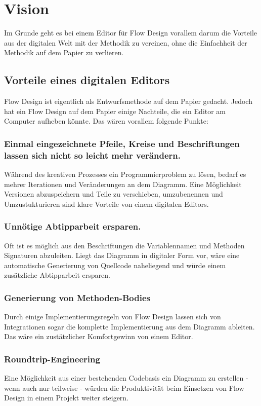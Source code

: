 \documentclass[11pt]{article}
\date{\today}
\title{}
\begin{document}
\tableofcontents

\section{Vision}
\label{sec:orgheadline7}
Im Grunde geht es bei einem Editor für Flow Design vorallem darum die Vorteile aus der digitalen Welt mit
der Methodik zu vereinen, ohne die Einfachheit der Methodik auf dem Papier zu
verlieren. 

\subsection{Vorteile eines digitalen Editors}
\label{sec:orgheadline5}
Flow Design ist eigentlich als Entwurfsmethode auf dem Papier gedacht.
Jedoch hat ein Flow Design auf dem Papier einige Nachteile, die ein Editor am
Computer aufheben könnte. Das wären vorallem folgende Punkte:
\subsubsection{Einmal eingezeichnete Pfeile, Kreise und Beschriftungen lassen sich nicht so leicht mehr verändern.}
\label{sec:orgheadline1}
Während des kreativen Prozesses ein Programmierproblem zu lösen, bedarf es
mehrer Iterationen und Veränderungen an dem Diagramm. Eine Möglichkeit Versionen
abzuspeichern und Teile zu verschieben, umzubenennen und Umzustukturieren sind
klare Vorteile von einem digitalen Editors.
\subsubsection{Unnötige Abtipparbeit ersparen.}
\label{sec:orgheadline2}
Oft ist es möglich aus den Beschriftungen die Variablennamen und
Methoden Signaturen abzuleiten. Liegt das Diagramm in digitaler Form vor, wäre eine automatische Generierung von Quellcode naheliegend und
würde einem zusätzliche Abtipparbeit ersparen.
\subsubsection{Generierung von Methoden-Bodies}
\label{sec:orgheadline3}
Durch einige Implementierungsregeln von Flow Design lassen sich von
Integrationen sogar die komplette Implementierung aus dem Diagramm
ableiten. Das wäre ein zustätzlicher Komfortgewinn von einem Editor.
\subsubsection{Roundtrip-Engineering}
\label{sec:orgheadline4}
Eine Möglichkeit aus einer bestehenden Codebasis ein Diagramm zu erstellen -
wenn auch nur teilweise - würden die Produktivität beim Einsetzen von Flow
Design in einem Projekt weiter steigern.
\end{document}
